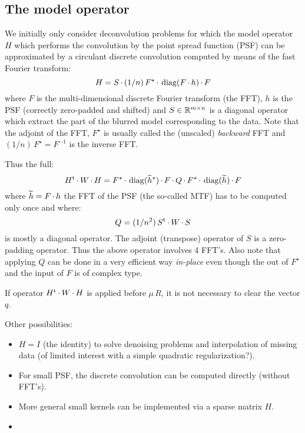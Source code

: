 \documentclass[9pt,a4paper,twocolumn]{article}
\renewcommand*{\cdot}{\mathord{\,\mathchar"2201\,}}
\renewcommand*{\FT}[1]{\widetilde{#1}}
\begin{document}
\subsection{The model operator}

We initially only consider deconvolution problems for which the model operator
$H$ which performs the convolution by the point spread function (PSF) can be
approximated by a circulant discrete convolution computed by means of the fast
Fourier transform:
\begin{equation}
  H = S \cdot (1/n)\,F^\star \cdot \Diag(F \cdot h) \cdot F
\end{equation}
where $F$ is the multi-dimensional discrete Fourier transform (the FFT), $h$
is the PSF (correctly zero-padded and shifted) and $S \in \mathbb{R}^{m \times n}$
is a diagonal operator which extract the part of the blurred model
corresponding to the data.  Note that the adjoint of the FFT, $F^\star$ is
usually called the (unscaled) \emph{backward} FFT and $(1/n)\,F^\star =
F^{-1}$ is the inverse FFT.

Thus the full:
\begin{equation}
  H\T \cdot W \cdot H
  = F^\star \cdot \Diag(\FT{h}^\star) \cdot F \cdot Q \cdot
    F^\star \cdot \Diag(\FT{h}) \cdot F
\end{equation}
where $\FT{h} = F \cdot h$ the FFT of the PSF (the so-called MTF) has to
be computed only once and where:
\begin{equation}
  Q =(1/n^2) \, S\T \cdot W \cdot S
\end{equation}
is mostly a diagonal operator.  The adjoint (transpose) operator of $S$ is a
zero-padding operator.  Thus the above operator involves 4 FFT's.  Also note
that applying $Q$ can be done in a very efficient way \emph{in-place} even
though the out of $F^\star$ and the input of $F$ is of complex type.

 If operator $H\T \cdot W \cdot H$ is applied before $\mu
\, R$, it is not necessary to clear the vector $q$.


Other possibilities:
\begin{itemize}
\item $H = I$ (the identity) to solve denoising problems and interpolation of
missing data (of limited interest with a simple quadratic regularization?).

\item For small PSF, the discrete convolution can be computed directly
(\ie without FFT's).

\item More general small kernels can be implemented via a sparse matrix $H$.

\item \etc

\end{itemize}
\end{document}

